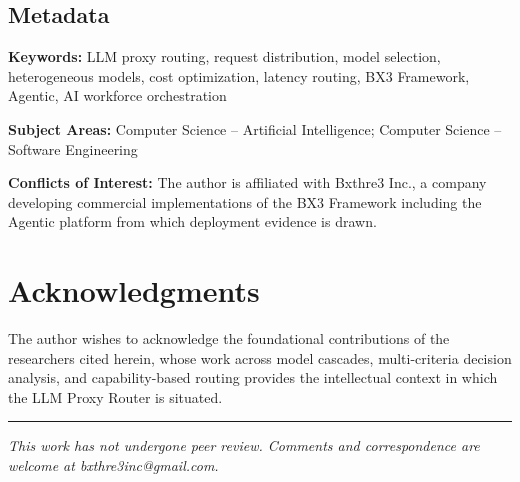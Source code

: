 \documentclass[12pt]{article}
\begin{document}
\subsection*{Metadata}

\textbf{Keywords:} LLM proxy routing, request distribution, model selection, heterogeneous models, cost optimization, latency routing, BX3 Framework, Agentic, AI workforce orchestration

\textbf{Subject Areas:} Computer Science -- Artificial Intelligence; Computer Science -- Software Engineering

\textbf{Conflicts of Interest:} The author is affiliated with Bxthre3 Inc., a company developing commercial implementations of the BX3 Framework including the Agentic platform from which deployment evidence is drawn.

\section*{Acknowledgments}

The author wishes to acknowledge the foundational contributions of the researchers cited herein, whose work across model cascades, multi-criteria decision analysis, and capability-based routing provides the intellectual context in which the LLM Proxy Router is situated.




\vspace{2em}
\hrule
\vspace{0.5em}
\noindent\small\textit{This work has not undergone peer review. Comments and correspondence are welcome at bxthre3inc@gmail.com.}
\end{document}

